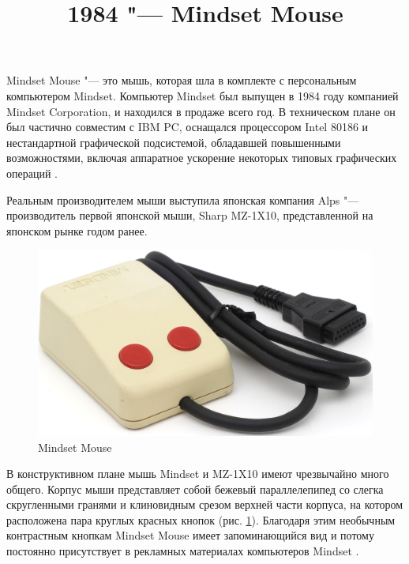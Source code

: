 \documentclass[11pt, a4paper]{article}
\begin{document}
\title{1984 "--- Mindset Mouse}
\date{}
\maketitle
{}

Mindset Mouse "--- это мышь, которая шла в комплекте с персональным компьютером Mindset. Компьютер Mindset был выпущен в 1984 году компанией Mindset Corporation, и находился в продаже всего год. В техническом плане он был частично совместим с IBM PC, оснащался процессором Intel 80186 и нестандартной графической подсистемой, обладавшей повышенными возможностями, включая аппаратное ускорение некоторых типовых графических операций \cite{byteMagazine}.

Реальным производителем мыши выступила японская компания Alps "--- производитель первой японской мыши, Sharp MZ-1X10, представленной на японском рынке годом ранее.

\begin{figure}[h]
   \centering
    \includegraphics[scale=0.6]{1984_mindset_mouse/pic_30.jpg}
    \caption{Mindset Mouse}
    \label{fig:MindsetMousePic}
\end{figure}

В конструктивном плане мышь Mindset и MZ-1X10 имеют чрезвычайно много общего. Корпус мыши представляет собой бежевый параллелепипед со слегка скругленными гранями и клиновидным срезом верхней части корпуса, на котором расположена пара круглых красных кнопок (рис. \ref{fig:MindsetMousePic}). Благодаря этим необычным контрастным кнопкам Mindset Mouse имеет запоминающийся вид и потому постоянно присутствует в рекламных материалах компьютеров Mindset \cite{adv}.
\end{document}
